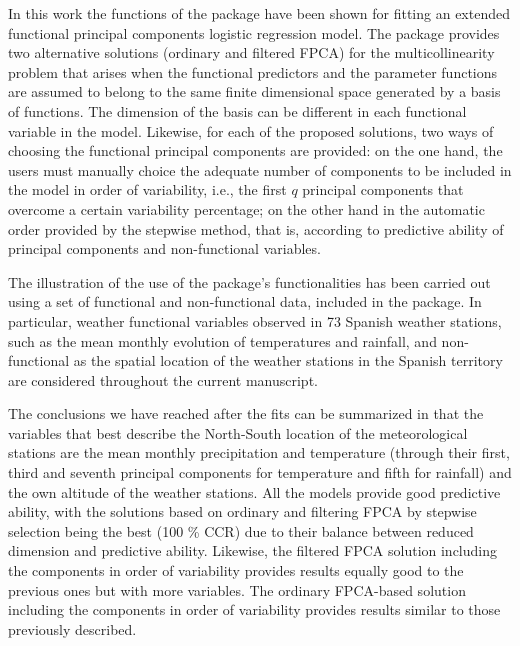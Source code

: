 In this work the functions of the  package have been shown for fitting an extended functional principal components logistic regression model. The package provides two alternative solutions (ordinary and filtered FPCA) for the multicollinearity problem that arises when the functional predictors and the parameter functions are assumed to belong to the same finite dimensional space generated by a basis of functions. The dimension of the basis can be different in each functional variable in the model. Likewise, for each of the proposed solutions, two ways of choosing the functional principal components are provided: on the one hand, the users must manually choice the adequate number of components to be included in the model in order of variability, i.e., the first $q$ principal components that overcome a certain variability percentage; on the other hand in the automatic order provided by the stepwise method, that is, according to predictive ability of principal components and non-functional variables.

The illustration of the use of the package's functionalities has been carried out using a set of functional and non-functional data, included in the  package. In particular, weather functional variables observed in 73 Spanish weather stations, such as the mean monthly evolution of temperatures and rainfall, and non-functional as the spatial location of the weather stations in the Spanish territory are considered throughout the current manuscript.

The conclusions we have reached after the fits can be summarized in that the variables that best describe the North-South location of the meteorological stations are the mean monthly precipitation and temperature (through their first, third and seventh principal components for temperature and fifth for rainfall) and the own altitude of the weather stations. All the models provide good predictive ability, with the solutions based on ordinary and filtering FPCA by stepwise selection being  the best (100 \% CCR) due to their balance between reduced dimension and predictive ability. Likewise, the filtered FPCA solution including the components in order of variability provides results equally good to the previous ones but with more variables. The ordinary FPCA-based solution including the components in order of variability provides results similar to those previously described.

